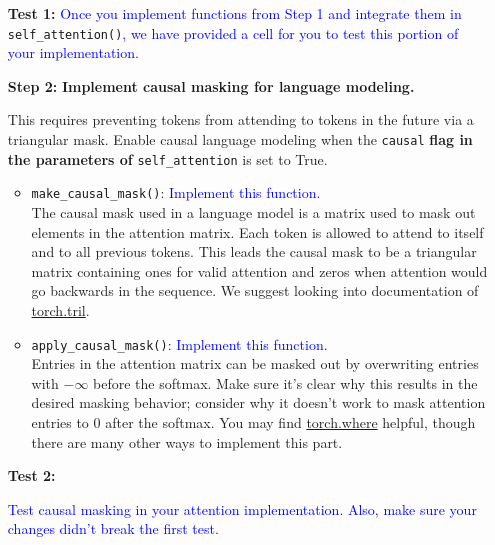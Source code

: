 \documentclass{article}
\begin{document}
\begin{enumerate}
\begin{itemize}
        \end{itemize}


        \item[\textbf{Test 1:}]
        \textcolor{blue}{Once you implement functions from Step 1 and integrate
        them in} \verb|self_attention()|\textcolor{blue}{, we have provided a
        cell for you to test this portion of your implementation.}

        \item[\textbf{Step 2:}]
        \textbf{Implement causal masking for language modeling.}
        
        This requires preventing tokens from attending to tokens in the future
        via a triangular mask. Enable causal language modeling when the
        \verb|causal|\textbf{ flag in the parameters of }\verb|self_attention|
        is set to True.
        
       \begin{itemize}
        \item \verb|make_causal_mask()|: \textcolor{blue}{Implement this
        function.} \\
        The causal mask used in a language model is a matrix used to mask out
        elements in the attention matrix. Each token is allowed to attend to
        itself and to all previous tokens. This leads the causal mask to be a
        triangular matrix containing ones for valid attention and zeros when
        attention would go backwards in the sequence. We suggest looking into
        documentation of
        \href{https://pytorch.org/docs/stable/generated/torch.tril}{torch.tril}.

        \item \verb|apply_causal_mask()|: \textcolor{blue}{Implement this
        function.} \\
        Entries in the attention matrix can be masked out by overwriting entries
        with $-\infty$ before the softmax. Make sure it's clear why this results
        in the desired masking behavior; consider why it doesn't work to mask
        attention entries to 0 after the softmax. You may find
        \href{https://pytorch.org/docs/stable/generated/torch.where}{torch.where}
        helpful, though there are many other ways to implement this part.
       \end{itemize}

        \item[\textbf{Test 2:}]

        \textcolor{blue}{Test causal masking in your attention implementation. Also, make sure your changes didn't break the first test.}
        

\end{enumerate}
\end{document}
